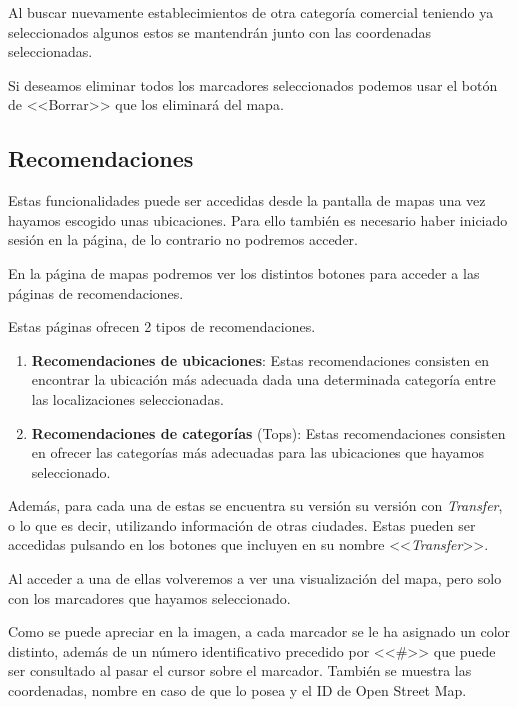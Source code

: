 
Al buscar nuevamente establecimientos de otra categoría comercial teniendo ya seleccionados algunos estos se mantendrán junto con las coordenadas seleccionadas.

Si deseamos eliminar todos los marcadores seleccionados podemos usar el botón de <<Borrar>> que los eliminará del mapa.

\subsection{Recomendaciones}

Estas funcionalidades puede ser accedidas desde la pantalla de mapas una vez hayamos escogido unas ubicaciones. Para ello también es necesario haber iniciado sesión en la página, de lo contrario no podremos acceder.

En la página de mapas podremos ver los distintos botones para acceder a las páginas de recomendaciones.

Estas páginas ofrecen 2 tipos de recomendaciones.

\begin{enumerate}
	\item \textbf{Recomendaciones de ubicaciones}: Estas recomendaciones consisten en encontrar la ubicación más adecuada dada una determinada categoría entre las localizaciones seleccionadas.
	\item \textbf{Recomendaciones de categorías} (Tops): Estas recomendaciones consisten en ofrecer las categorías más adecuadas para las ubicaciones que hayamos seleccionado.
\end{enumerate}

Además, para cada una de estas se encuentra su versión su versión con \textit{Transfer}, o lo que es decir, utilizando información de otras ciudades. Estas pueden ser accedidas pulsando en los botones que incluyen en su nombre <<\textit{Transfer}>>.

Al acceder a una de ellas volveremos a ver una visualización del mapa, pero solo con los marcadores que hayamos seleccionado.


Como se puede apreciar en la imagen, a cada marcador se le ha asignado un color distinto, además de un número identificativo precedido por <<\#>> que puede ser consultado al pasar el cursor sobre el marcador. También se muestra las coordenadas, nombre en caso de que lo posea y el ID de Open Street Map.

